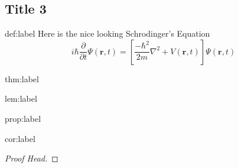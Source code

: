 \documentclass{package/notes}
\begin{document}
\subsection{Title 3}

\begin{definition}{def:label} %
	\lipsum[1][1-3]
	Here is the nice looking Schrodinger's Equation
	\[i\hbar\frac{\partial}{\partial t} \varPsi(\mathbf{r},t) = \left [ \frac{-\hbar^2}{2m}\nabla^2 + V(\mathbf{r},t)\right ] \varPsi(\mathbf{r},t)\]
\end{definition}

\begin{theorem}{thm:label}%
	\lipsum[2][1-3]
\end{theorem}

\begin{lemma}{lem:label}%
	\lipsum[3][1-3]
\end{lemma}

\begin{proposition}{prop:label}%
	\lipsum[4][1-3]
\end{proposition}

\begin{corollary}{cor:label}%
	\lipsum[5][1-3]
\end{corollary}

\begin{problem}%
	\lipsum[1][1-3]
\end{problem}
\begin{proof}[Proof Head]
	\lipsum[1][1-10]
\end{proof}
\end{document}
